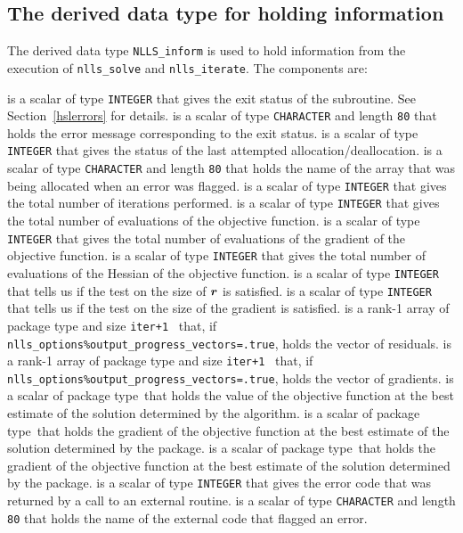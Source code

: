 \documentclass{spec}
\newcommand{\scalarinteger}{is a scalar of type {\tt INTEGER} }
\newcommand{\scalarcharacter}[1]{is a scalar of type {\tt CHARACTER} and length {\tt #1} }
\newcommand{\scalarreal}{is a scalar of package type\ }
\newcommand{\ronearrayreal}[1]{is a rank-1 array of package type and size {\tt #1}\ }
\begin{document}
\subsection{The derived data type for holding information}
\label{typeinform}
The derived data type {\tt NLLS\_inform} is used
to hold information from the execution of {\tt nlls\_solve} and {\tt nlls\_iterate}.
The components are:
\begin{description}
       \scalarinteger that gives the exit status of the subroutine.  See Section~\ref{hslerrors} for details.
       \scalarcharacter{80} that holds the error message corresponding to the exit status.
 \scalarinteger that gives the status of the last attempted allocation/deallocation.
 \scalarcharacter{80} that holds the name of the array that was being allocated when an error was flagged.
 \scalarinteger that gives the total number of iterations performed.
 \scalarinteger that gives the total number of evaluations of the objective function.
 \scalarinteger that gives the total number of evaluations of the gradient of the objective function.
 \scalarinteger that gives the total number of evaluations of the Hessian of the objective function.
 \scalarinteger that tells us if the test on the size of \({\bm r}\) is satisfied.
 \scalarinteger that tells us if the test on the size of the gradient is satisfied.
 \ronearrayreal{iter+1} that, if {\tt nlls\_options\%output\_progress\_vectors=.true}, holds the vector of residuals.
 \ronearrayreal{iter+1} that, if {\tt nlls\_options\%output\_progress\_vectors=.true}, holds the vector of gradients.
 \scalarreal that holds the value of the objective function at the best estimate of the solution determined by the algorithm.
 \scalarreal that holds the gradient of the objective function at the best estimate of the solution determined by the package.
 \scalarreal that holds the gradient of the objective function at the best estimate of the solution determined by the package.
 \scalarinteger that gives the error code that was returned by a call to an external routine.
 \scalarcharacter{80} that holds the name of the external code that flagged an error.
\end{description}

\end{document}
